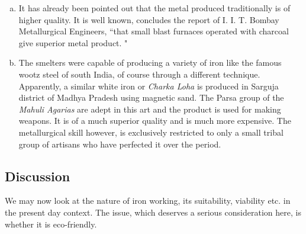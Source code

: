 \begin{enumerate}[a)]
\item It has already been pointed out that the metal produced traditionally is of higher quality. It is well known, concludes the report of I. I. T. Bombay Metallurgical Engineers, ``that small blast furnaces operated with charcoal give superior metal product. "
\item The smelters were capable of producing a variety of iron like the famous wootz steel of south India, of course through a different technique. Apparently, a similar white iron or {\it Charka Loha} is produced in Sarguja district of Madhya Pradesh using magnetic sand. The Parsa group of the {\it Mahuli Agarias} are adept in this art and the product is used for making weapons. It is of a much superior quality and is much more expensive. The metallurgical skill however, is exclusively restricted to only a small tribal group of artisans who have perfected it over the period.
\end{enumerate}

\vspace{-.5cm}

\subsection*{Discussion}\label{chapter7-subsection-7.1c}

\vspace{-.2cm}

We may now look at the nature of iron working, its suitability, viability etc. in the present day context. The issue, which deserves a serious consideration here, is whether it is eco-friendly.

